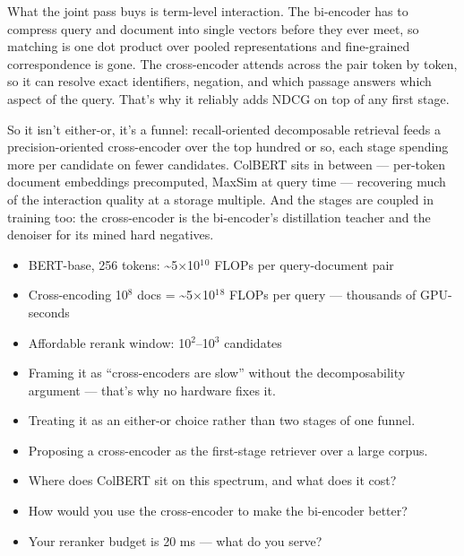 \documentclass[10pt,twoside]{book}
\newcommand{\lab}[1]{\par\vspace{5pt}\noindent{\sffamily\footnotesize\bfseries\color{accent}#1}\par\vspace{1pt}}
\newcommand{\flab}[1]{\par\vspace{5pt}\noindent{\sffamily\footnotesize\bfseries\color{flag}#1}\par\vspace{1pt}}
\begin{document}
What the joint pass buys is term-level interaction. The bi-encoder has to compress query and document into single vectors before they ever meet, so matching is one dot product over pooled representations and fine-grained correspondence is gone. The cross-encoder attends across the pair token by token, so it can resolve exact identifiers, negation, and which passage answers which aspect of the query. That's why it reliably adds NDCG on top of any first stage.\par\vspace{3pt}
So it isn't either-or, it's a funnel: recall-oriented decomposable retrieval feeds a precision-oriented cross-encoder over the top hundred or so, each stage spending more per candidate on fewer candidates. ColBERT sits in between --- per-token document embeddings precomputed, MaxSim at query time --- recovering much of the interaction quality at a storage multiple. And the stages are coupled in training too: the cross-encoder is the bi-encoder's distillation teacher and the denoiser for its mined hard negatives.\par\vspace{3pt}
\lab{Numbers}
\begin{itemize}
\item BERT-base, 256 tokens: \textasciitilde{}5$\times$10$^1$$^0$ FLOPs per query-document pair
\item Cross-encoding 10$^8$ docs = \textasciitilde{}5$\times$10$^1$$^8$ FLOPs per query --- thousands of GPU-seconds
\item Affordable rerank window: 10$^2$--10$^3$ candidates
\end{itemize}
\flab{Loses the signal}
\begin{itemize}
\item Framing it as ``cross-encoders are slow'' without the decomposability argument --- that's why no hardware fixes it.
\item Treating it as an either-or choice rather than two stages of one funnel.
\item Proposing a cross-encoder as the first-stage retriever over a large corpus.
\end{itemize}
\lab{Then they ask}
\begin{itemize}
\item Where does ColBERT sit on this spectrum, and what does it cost?
\item How would you use the cross-encoder to make the bi-encoder better?
\item Your reranker budget is 20 ms --- what do you serve?
\end{itemize}
\end{document}
